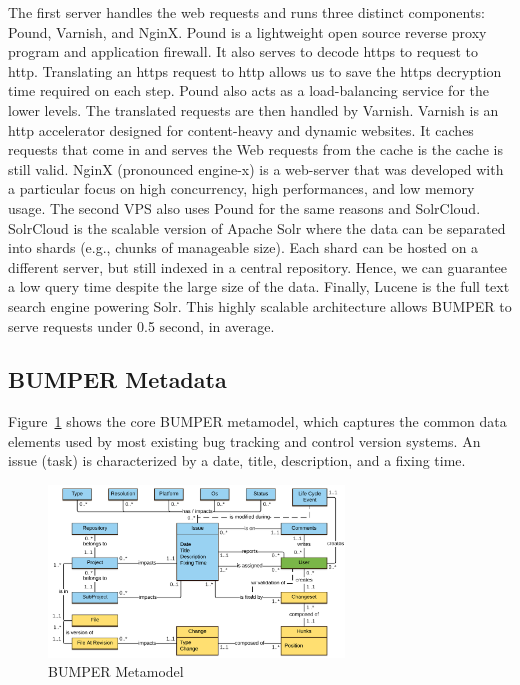 \documentclass[conference]{IEEEtran}
\begin{document}
The first server handles the web requests and
runs three distinct components: Pound, Varnish, and NginX.
Pound is a lightweight open source reverse proxy program
and application firewall.
It also serves to decode https to request to http.
Translating an https request to http allows us to save the https decryption time required on each step.
Pound also acts as a load-balancing service for the lower levels.
The translated requests are then handled by Varnish.
Varnish is an http accelerator designed for content-heavy and dynamic websites.
It caches requests that come in and serves the Web requests from the cache is the cache is still valid.
NginX (pronounced engine-x) is a web-server that was developed with a particular focus on high concurrency, high performances, and low memory usage.
The second VPS also uses Pound for the same reasons and SolrCloud.
SolrCloud is the scalable version of Apache Solr where the data can be separated into shards (e.g., chunks of manageable size).
Each shard can be hosted on a different server, but still indexed in a central repository.
Hence, we can guarantee a low query time despite the  large size of the data.
Finally, Lucene is the full text search engine powering Solr.
This highly scalable architecture allows BUMPER to serve requests under 0.5 second, in average.

\subsection{BUMPER Metadata}
\label{sub:BUMPER Metadata}

Figure~\ref{fig:bumper-metamodel}  shows the core BUMPER metamodel, which captures the common data elements used by most existing bug tracking and control version systems.
An issue (task) is characterized by a date, title, description, and a fixing time.

\begin{figure}
  \centering
  \includegraphics[width=0.7\textwidth]{media/Bumper-Model.png}
  \caption{BUMPER Metamodel\label{fig:bumper-metamodel}}
\vspace{-1.8em}
\end{figure}
\end{document}
